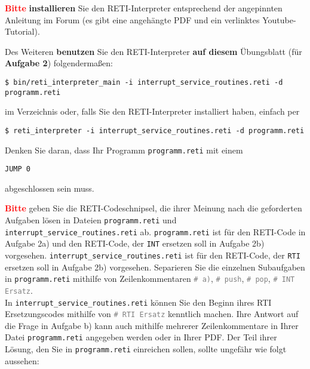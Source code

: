 \documentclass{article}
\newenvironment{adjustedminipage}[1]
  {\vspace{0.15cm}\begin{minipage}{#1}}
  {\end{minipage}}
\begin{document}
{\LARGE \textbf{\textcolor{red}{Bitte}}} \textbf{installieren} Sie den RETI-Interpreter entsprechend der angepinnten Anleitung im Forum (es gibt eine angehängte PDF und ein verlinktes Youtube-Tutorial).

Des Weiteren \textbf{benutzen} Sie den RETI-Interpreter \textbf{auf diesem} Übungsblatt (für \textbf{Aufgabe 2}) folgendermaßen:

\begin{center}
	\begin{adjustedminipage}{0.9\textwidth}
		\begin{verbatim}
$ bin/reti_interpreter_main -i interrupt_service_routines.reti -d programm.reti
    \end{verbatim}
	\end{adjustedminipage}
\end{center}

	im Verzeichnis oder, falls Sie den RETI-Interpreter installiert haben, einfach per

\begin{center}
	\begin{adjustedminipage}{0.9\textwidth}
		\begin{verbatim}
$ reti_interpreter -i interrupt_service_routines.reti -d programm.reti
    \end{verbatim}
	\end{adjustedminipage}
\end{center}

Denken Sie daran, dass Ihr Programm \verb|programm.reti| mit einem

\begin{center}
	\begin{adjustedminipage}{0.9\textwidth}
		\begin{verbatim}
JUMP 0
    \end{verbatim}
	\end{adjustedminipage}
\end{center}

abgeschlossen sein muss.

{\LARGE \textbf{\textcolor{red}{Bitte}}} geben Sie die RETI-Codeschnipsel, die ihrer Meinung nach die geforderten Aufgaben lösen in Dateien \verb|programm.reti| und \verb|interrupt_service_routines.reti| ab. \verb|programm.reti| ist für den RETI-Code in Aufgabe 2a) und den RETI-Code, der \verb|INT| ersetzen soll in Aufgabe 2b) vorgesehen. \verb|interrupt_service_routines.reti| ist für den RETI-Code, der \verb|RTI| ersetzen soll in Aufgabe 2b) vorgesehen. Separieren Sie die einzelnen Subaufgaben in \verb|programm.reti| mithilfe von Zeilenkommentaren \textcolor{gray}{\texttt{\# a)}}, \textcolor{gray}{\texttt{\# push}}, \textcolor{gray}{\texttt{\# pop}}, \textcolor{gray}{\texttt{\# INT Ersatz}}.\\
In \verb|interrupt_service_routines.reti| können Sie den Beginn ihres RTI Ersetzungscodes mithilfe von \textcolor{gray}{\texttt{\# RTI Ersatz}} kenntlich machen. Ihre Antwort auf die Frage in Aufgabe b) kann auch mithilfe mehrerer Zeilenkommentare in Ihrer Datei \verb|programm.reti| angegeben werden oder in Ihrer PDF. Der Teil ihrer Lösung, den Sie in \verb|programm.reti| einreichen sollen, sollte ungefähr wie folgt aussehen:
\end{document}
